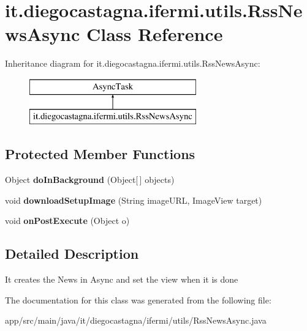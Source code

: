 \hypertarget{classit_1_1diegocastagna_1_1ifermi_1_1utils_1_1_rss_news_async}{}\section{it.\+diegocastagna.\+ifermi.\+utils.\+Rss\+News\+Async Class Reference}
\label{classit_1_1diegocastagna_1_1ifermi_1_1utils_1_1_rss_news_async}
Inheritance diagram for it.\+diegocastagna.\+ifermi.\+utils.\+Rss\+News\+Async\+:\begin{figure}[H]
\begin{center}
\leavevmode
\includegraphics[height=2.000000cm]{classit_1_1diegocastagna_1_1ifermi_1_1utils_1_1_rss_news_async}
\end{center}
\end{figure}
\subsection*{Protected Member Functions}
\begin{DoxyCompactItemize}
\item 
\mbox{\label{classit_1_1diegocastagna_1_1ifermi_1_1utils_1_1_rss_news_async_ac191a864cd1a1956899a76ced81fd9f5}} 
Object {\bfseries do\+In\+Background} (Object\mbox{[}$\,$\mbox{]} objects)
\item 
\mbox{\label{classit_1_1diegocastagna_1_1ifermi_1_1utils_1_1_rss_news_async_a288dd33fcfe35401b23077d418b4faf4}} 
void {\bfseries download\+Setup\+Image} (String image\+U\+RL, Image\+View target)
\item 
\mbox{\label{classit_1_1diegocastagna_1_1ifermi_1_1utils_1_1_rss_news_async_a1196475824fbf8fd716df24be271aca2}} 
void {\bfseries on\+Post\+Execute} (Object o)
\end{DoxyCompactItemize}


\subsection{Detailed Description}
It creates the News in Async and set the view when it is done 

The documentation for this class was generated from the following file\+:\begin{DoxyCompactItemize}
\item 
app/src/main/java/it/diegocastagna/ifermi/utils/Rss\+News\+Async.\+java\end{DoxyCompactItemize}
